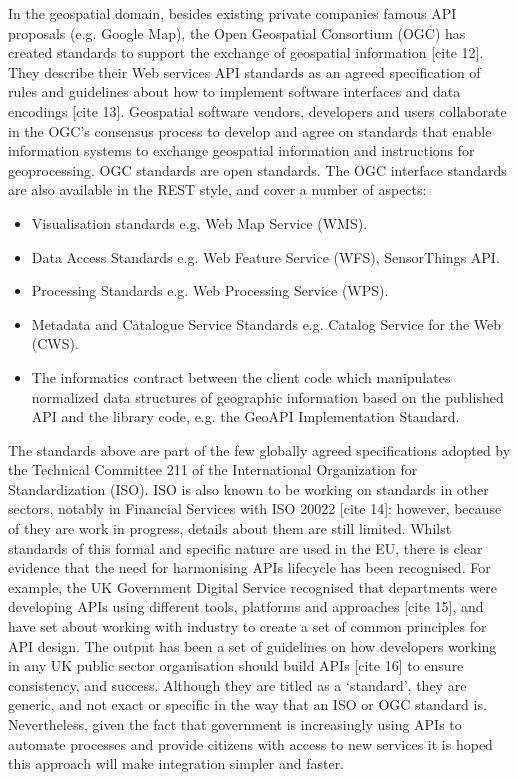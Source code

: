 In the geospatial domain, besides existing private companies famous API proposals
(e.g. Google Map), the Open Geospatial Consortium (OGC) has created standards to
support the exchange of geospatial information [cite 12]. They describe their Web services
API standards as an agreed specification of rules and guidelines about how to
implement software interfaces and data encodings [cite 13]. Geospatial software vendors,
developers and users collaborate in the OGC’s consensus process to develop and
agree on standards that enable information systems to exchange geospatial
information and instructions for geoprocessing. OGC standards are open standards.
The OGC interface standards are also available in the REST style, and cover a
number of aspects:
\begin{itemize}
	\item Visualisation standards e.g. Web Map Service (WMS).
	\item Data Access Standards e.g. Web Feature Service (WFS), SensorThings API.
	\item Processing Standards e.g. Web Processing Service (WPS).
	\item Metadata and Catalogue Service Standards e.g. Catalog Service for the Web (CWS).
	\item The informatics contract between the client code which manipulates normalized
	data structures of geographic information based on the published API and the library
	code, e.g. the GeoAPI Implementation Standard.
\end{itemize}

The standards above are part of the few globally agreed specifications adopted by
the Technical Committee 211 of the International Organization for Standardization
(ISO). ISO is also known to be working on standards in other sectors, notably in
Financial Services with ISO 20022 [cite 14]: however, because of they are work in
progress,
details about them are still limited. Whilst standards of this formal and specific
nature are used in the EU, there is clear evidence that the need for harmonising
APIs lifecycle has been recognised. For example, the UK Government Digital Service
recognised that departments were developing APIs using different tools, platforms
and approaches [cite 15], and have set about working with industry to create a set of
common principles for API design. The output has been a set of guidelines on how
developers working in any UK public sector organisation should build APIs [cite 16] to
ensure consistency, and success. Although they are titled as a ‘standard’, they
are generic, and not exact or specific in the way that an ISO or OGC standard is.
Nevertheless, given the fact that government is increasingly using APIs to
automate processes and provide citizens with access to new services it is hoped
this approach will make integration simpler and faster.